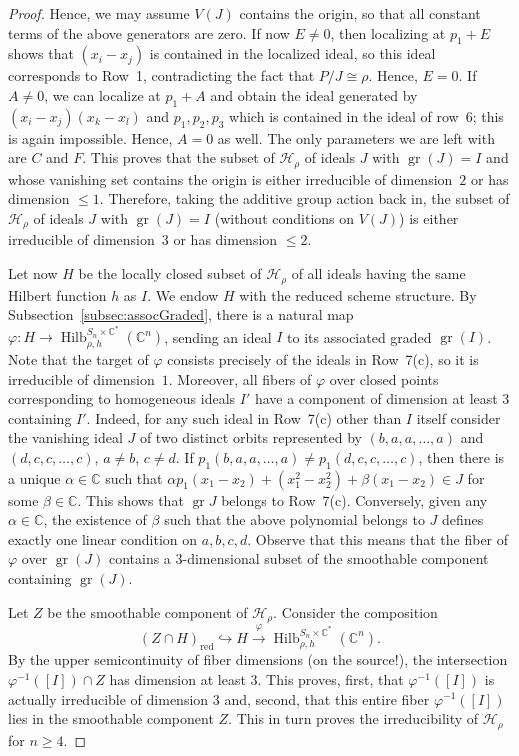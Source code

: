 \documentclass[11pt]{amsart}
\theoremstyle{definition}
\newcommand{\CC}{\mathbb{C}}
\newcommand{\HH}{\mathcal{H}}
\DeclareMathOperator{\Hilb}{Hilb}
\DeclareMathOperator{\gr}{gr}
\begin{document}
\begin{proof}
Hence, we may assume $V(J)$ contains the origin, so that all constant terms of the above generators are zero. If now $E \neq 0$, then localizing at $p_1 + E$ shows that $(x_i - x_j)$ is contained in the localized ideal, so this ideal corresponds to Row~1, contradicting the fact that $P/J \cong \rho$. Hence, $E = 0$. If $A \neq 0$, we can localize at $p_1 + A$ and obtain the ideal generated by $(x_i-x_j)(x_k-x_l)$ and $p_1,p_2,p_3$ which is contained in the ideal of row~6; this is again impossible. Hence, $A = 0$ as well. The only parameters we are left with are $C$ and $F$. This proves that the subset of $\HH_\rho$ of ideals $J$ with $\gr(J) = I$ and whose vanishing set contains the origin is either irreducible of dimension~$2$ or has dimension $\leq 1$. Therefore, taking the additive group action back in, the subset of $\HH_\rho$ of ideals $J$ with $\gr(J) = I$ (without conditions on $V(J)$) is either irreducible of dimension~$3$ or has dimension $\leq 2$.

Let now $H$ be the locally closed subset of $\HH_\rho$ of all ideals having the same Hilbert function $h$ as $I$. We endow $H$ with the reduced scheme structure. By Subsection~\ref{subsec:assocGraded}, there is a natural map $\varphi \colon H \longrightarrow \Hilb^{S_n \times \CC^\ast}_{\rho,h}(\CC^n)$, sending an ideal $I$ to its associated graded $\gr(I)$. Note that the target of $\varphi$ consists precisely of the ideals in Row~7(c), so it is irreducible of dimension~$1$. Moreover, all fibers of $\varphi$ over closed points corresponding to homogeneous ideals $I'$ have a component of dimension at least $3$ containing $I'$. Indeed, for any such ideal in Row~7(c) other than $I$ itself consider the vanishing ideal $J$ of two distinct orbits represented by $(b,a,a,\ldots,a)$ and $(d,c,c,\ldots,c)$, $a \neq b$, $c \neq d$. If $p_1(b,a,a,\ldots,a) \neq p_1(d,c,c,\ldots,c)$, then there is a unique $\alpha \in \CC$ such that $\alpha p_1(x_1 - x_2) + (x_1^2 - x_2^2) + \beta (x_1 - x_2) \in J$ for some $\beta \in \CC$. This shows that $\gr J$ belongs to Row~7(c).
Conversely, given any $\alpha \in \CC$, the existence of $\beta$ such that the above polynomial belongs to $J$ defines exactly one linear condition on $a,b,c,d$. Observe that this means that the fiber of $\varphi$ over $\gr(J)$ contains a $3$-dimensional subset of the smoothable component containing $\gr(J)$.

Let $Z$ be the smoothable component of $\HH_\rho$. Consider the composition
\begin{equation*}
    (Z \cap H)_{\mathrm{red}} \hookrightarrow H \overset{\varphi}{\longrightarrow} \Hilb^{S_n \times \CC^\ast}_{\rho,h}(\CC^n).
\end{equation*}
By the upper semicontinuity of fiber dimensions (on the source!), the intersection $\varphi^{-1}([I]) \cap Z$ has dimension at least $3$. This proves, first, that $\varphi^{-1}([I])$ is actually irreducible of dimension $3$ and, second, that this entire fiber $\varphi^{-1}([I])$ lies in the smoothable component $Z$. This in turn proves the irreducibility of $\HH_\rho$ for $n \geq 4$.


\end{proof}
\end{document}
